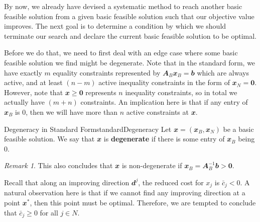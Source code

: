 \documentclass[math, code]{amznotes}
\theoremstyle{remark}
\newtheorem*{remark}{Remark}
\begin{document}
By now, we already have devised a systematic method to reach another basic feasible solution from a given basic feasible solution such that our objective value improves. The next goal is to determine a condition by which we should terminate our search and declare the current basic feasible solution to be optimal.

Before we do that, we need to first deal with an edge case where some basic feasible solution we find might be degenerate. Note that in the standard form, we have exactly $m$ equality constraints represented by $\mathbfit{A}_B\mathbfit{x}_B = \mathbfit{b}$ which are always active, and at least $(n - m)$ active inequality constraints in the form of $\mathbfit{x}_N = \mathbf{0}$. However, note that $\mathbfit{x} \geq \mathbf{0}$ represents $n$ inequality constraints, so in total we actually have $(m + n)$ constraints. An implication here is that if any entry of $\mathbfit{x}_B$ is $0$, then we will have more than $n$ active constraints at $\mathbfit{x}$.
\begin{dfnbox}{Degeneracy in Standard Form}{standardDegeneracy}
    Let $\mathbfit{x} = \left(\mathbfit{x}_B, \mathbfit{x}_N\right)$ be a basic feasible solution. We say that $\mathbfit{x}$ is {\color{red} \textbf{degenerate}} if there is some entry of $\mathbfit{x}_B$ being $0$.
\end{dfnbox}
\begin{notebox}
    \begin{remark}
        This also concludes that $\mathbfit{x}$ is non-degenerate if $\mathbfit{x}_B = \mathbfit{A}_B^{-1}\mathbfit{b} > \mathbf{0}$.
    \end{remark}
\end{notebox}
Recall that along an improving direction $\mathbfit{d}^j$, the reduced cost for $x_j$ is $\bar{c}_j < 0$. A natural observation here is that if we cannot find any improving direction at a point $\mathbfit{x}^*$, then this point must be optimal. Therefore, we are tempted to conclude that $\bar{c}_j \geq 0$ for all $j \in N$.
\end{document}
